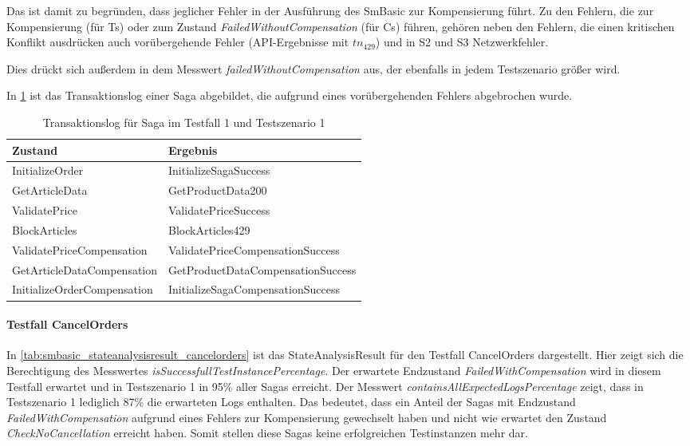 Das ist damit zu begründen, dass jeglicher Fehler in der Ausführung des SmBasic zur Kompensierung führt. Zu den Fehlern, die zur Kompensierung (für Ts) oder zum Zustand \textit{FailedWithoutCompensation} (für Cs) führen, gehören neben den Fehlern, die einen kritischen Konflikt ausdrücken auch vorübergehende Fehler (API-Ergebnisse mit $tn_{429}$) und in S2 und S3 Netzwerkfehler. 

Dies drückt sich außerdem in dem Messwert \textit{failedWithoutCompensation} aus, der ebenfalls in jedem Testszenario größer wird.

In \cref{tab:transaktionslog_ts1_tc1_429} ist das Transaktionslog einer Saga abgebildet, die aufgrund eines vorübergehenden Fehlers abgebrochen wurde. 

\begin{center}
	\fontsize{9}{12}\selectfont
	\begin{longtable}[h]{|p{4.5cm}|p{7cm}|}
		\hline
		Zustand & Ergebnis \\* \hline
		\endhead
		\hline
		\caption{Transaktionslog für Saga im Testfall 1 und Testszenario 1}
		\label{tab:transaktionslog_ts1_tc1_429}
		\endfoot
  		InitializeOrder & InitializeSagaSuccess \\* \hline
		GetArticleData & GetProductData200 \\* \hline
		ValidatePrice & ValidatePriceSuccess \\* \hline
		\rowcolor{Gray}
		BlockArticles & BlockArticles429 \\* \hline
		ValidatePriceCompensation & ValidatePriceCompensationSuccess \\* \hline
		GetArticleDataCompensation & GetProductDataCompensationSuccess \\* \hline
		InitializeOrderCompensation & InitializeSagaCompensationSuccess \\* \hline
	\end{longtable}
\end{center}
\FloatBarrier

\paragraph*{Testfall CancelOrders}
In \cref{tab:smbasic_stateanalysisresult_cancelorders} ist das StateAnalysisResult für den Testfall CancelOrders dargestellt. Hier zeigt sich die Berechtigung des Messwertes \textit{isSuccessfullTestInstancePercentage}. Der erwartete Endzustand \textit{FailedWithCompensation} wird in diesem Testfall erwartet und in Testszenario 1 in 95\% aller Sagas erreicht. Der Messwert \textit{containsAllExpectedLogsPercentage} zeigt, dass in Testszenario 1 lediglich 87\% die erwarteten Logs enthalten. Das bedeutet, dass ein Anteil der Sagas mit Endzustand \textit{FailedWithCompensation} aufgrund eines Fehlers zur Kompensierung gewechselt haben und nicht wie erwartet den Zustand \textit{CheckNoCancellation} erreicht haben. Somit stellen diese Sagas keine erfolgreichen Testinstanzen mehr dar.

